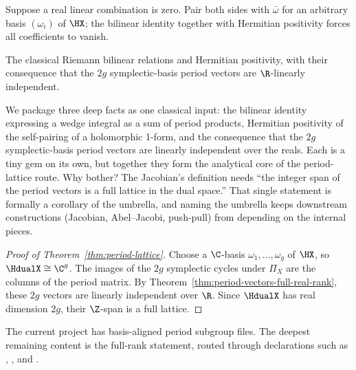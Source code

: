 \begin{proofsketch}
Suppose a real linear combination is zero. Pair both sides with
\(\bar\omega\) for an arbitrary basis \((\omega_i)\) of \(\HX\); the
bilinear identity together with Hermitian positivity forces all
coefficients to vanish.
\end{proofsketch}

\begin{theorem}
\label{input:riemann-bilinear}
\leanok
The classical Riemann bilinear relations and Hermitian positivity, with
their consequence that the \(2g\) symplectic-basis period vectors are
\(\R\)-linearly independent.
\end{theorem}

\begin{layman}
We package three deep facts as one classical input: the bilinear
identity expressing a wedge integral as a sum of period products,
Hermitian positivity of the self-pairing of a holomorphic 1-form, and
the consequence that the \(2g\) symplectic-basis period vectors are
linearly independent over the reals. Each is a tiny gem on its own,
but together they form the analytical core of the period-lattice
route. Why bother? The Jacobian's definition needs ``the integer span
of the period vectors is a full lattice in the dual space.'' That
single statement is formally a corollary of the umbrella, and naming
the umbrella keeps downstream constructions (Jacobian, Abel–Jacobi,
push-pull) from depending on the internal pieces.
\end{layman}

\begin{proof}[Proof of Theorem~\ref{thm:period-lattice}]
Choose a \(\C\)-basis \(\omega_1,\dots,\omega_g\) of \(\HX\), so
\(\HdualX\cong\C^g\). The images of the \(2g\) symplectic cycles under
\(\Pi_X\) are the columns of the period matrix.
By Theorem~\ref{thm:period-vectors-full-real-rank}, these \(2g\) vectors
are linearly independent over \(\R\). Since \(\HdualX\) has real
dimension \(2g\), their \(\Z\)-span is a full lattice.
\end{proof}

\begin{formalizationnote}
The current project has basis-aligned period subgroup files. The deepest
remaining content is the full-rank statement, routed through declarations such
as ,
, and
.
\end{formalizationnote}
